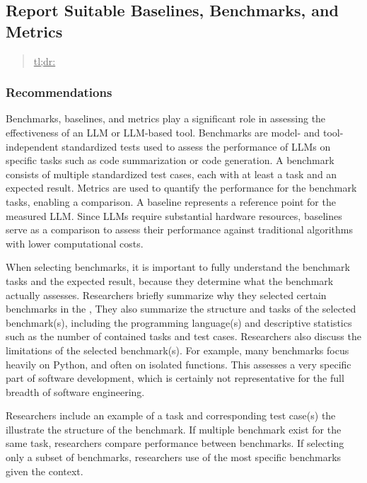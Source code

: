 



\subsection{Report Suitable Baselines, Benchmarks, and Metrics}
\label{sec:report-suitable-baselines-benchmarks-and-metrics}

\begin{quote}
\underline{tl;dr:} 
\end{quote}

\subsubsection{Recommendations}

Benchmarks, baselines, and metrics play a significant role in assessing the effectiveness of an LLM or LLM-based tool.
Benchmarks are model- and tool-independent standardized tests used to assess the performance of LLMs on specific tasks such as code summarization or code generation.
A benchmark consists of multiple standardized test cases, each with at least a task and an expected result.
Metrics are used to quantify the performance for the benchmark tasks, enabling a comparison.
A baseline represents a reference point for the measured LLM.
Since LLMs require substantial hardware resources, baselines serve as a comparison to assess their performance against traditional algorithms with lower computational costs.

When selecting benchmarks, it is important to fully understand the benchmark tasks and the expected result, because they determine what the benchmark actually assesses.
Researchers \must briefly summarize why they selected certain benchmarks in the \paper, 
They \should also summarize the structure and tasks of the selected benchmark(s), including the programming language(s) and descriptive statistics such as the number of contained tasks and test cases.
Researchers \should also discuss the limitations of the selected benchmark(s).
For example, many benchmarks focus heavily on Python, and often on isolated functions.
This assesses a very specific part of software development, which is certainly not representative for the full breadth of software engineering.

Researchers \may include an example of a task and corresponding test case(s) the illustrate the structure of the benchmark.
If multiple benchmark exist for the same task, researchers \should compare performance between benchmarks.
If selecting only a subset of benchmarks, researchers \should use of the most specific benchmarks given the context.

